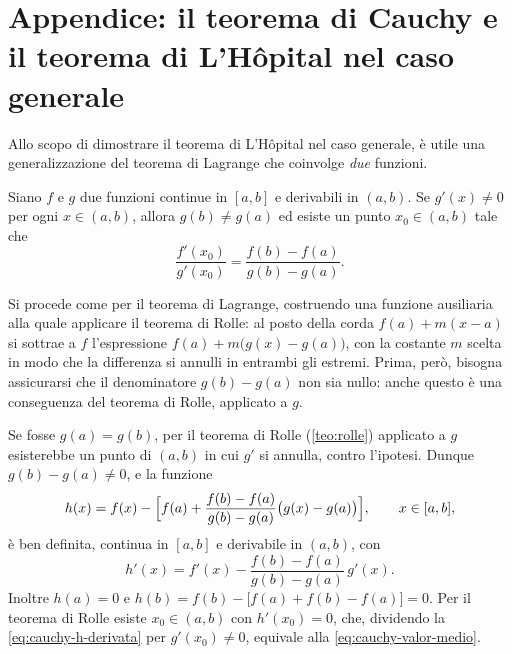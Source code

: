 \section{Appendice: il teorema di Cauchy e il teorema di L'Hôpital nel caso generale}
\label{sec:cauchy-hopital}

Allo scopo di dimostrare il teorema di L'Hôpital nel caso generale, è utile una
generalizzazione del teorema di Lagrange che coinvolge \emph{due} funzioni.

\begin{teorema}[di Cauchy]\label{teo:cauchy}
Siano $f$ e $g$ due funzioni continue in $[a,b]$ e derivabili in $(a,b)$. Se
$g'(x)\neq0$ per ogni $x\in(a,b)$, allora $g(b)\neq g(a)$ ed esiste un punto
$x_{0}\in(a,b)$ tale che
\begin{equation}\label{eq:cauchy-valor-medio}
  \frac{f'(x_{0})}{g'(x_{0})}=\frac{f(b)-f(a)}{g(b)-g(a)} .
\end{equation}
\end{teorema}

\begin{schema}
\end{schema}

\begin{strategia}
Si procede come per il teorema di Lagrange, costruendo una funzione ausiliaria alla
quale applicare il teorema di Rolle: al posto della corda $f(a)+m(x-a)$ si sottrae a $f$
l'espressione $f(a)+m\bigl(g(x)-g(a)\bigr)$, con la costante $m$ scelta in modo che la
differenza si annulli in entrambi gli estremi. Prima, però, bisogna assicurarsi che il
denominatore $g(b)-g(a)$ non sia nullo: anche questo è una conseguenza del teorema di
Rolle, applicato a $g$.
\end{strategia}

\begin{dimostrazione}
Se fosse $g(a)=g(b)$, per il teorema di Rolle (\cref{teo:rolle}) applicato a $g$
esisterebbe un punto di $(a,b)$ in cui $g'$ si annulla, contro l'ipotesi. Dunque
$g(b)-g(a)\neq0$, e la funzione
\begin{equation}\label{eq:cauchy-h}
  h(x)=f(x)-\Bigl[f(a)+\frac{f(b)-f(a)}{g(b)-g(a)}\bigl(g(x)-g(a)\bigr)\Bigr],
  \qquad x\in[a,b],
\end{equation}
è ben definita, continua in $[a,b]$ e derivabile in $(a,b)$, con
\begin{equation}\label{eq:cauchy-h-derivata}
  h'(x)=f'(x)-\frac{f(b)-f(a)}{g(b)-g(a)}\,g'(x) .
\end{equation}
Inoltre $h(a)=0$ e $h(b)=f(b)-\bigl[f(a)+f(b)-f(a)\bigr]=0$. Per il teorema di Rolle
esiste $x_{0}\in(a,b)$ con $h'(x_{0})=0$, che, dividendo la
\eqref{eq:cauchy-h-derivata} per $g'(x_{0})\neq0$, equivale alla \eqref{eq:cauchy-valor-medio}.
\end{dimostrazione}

